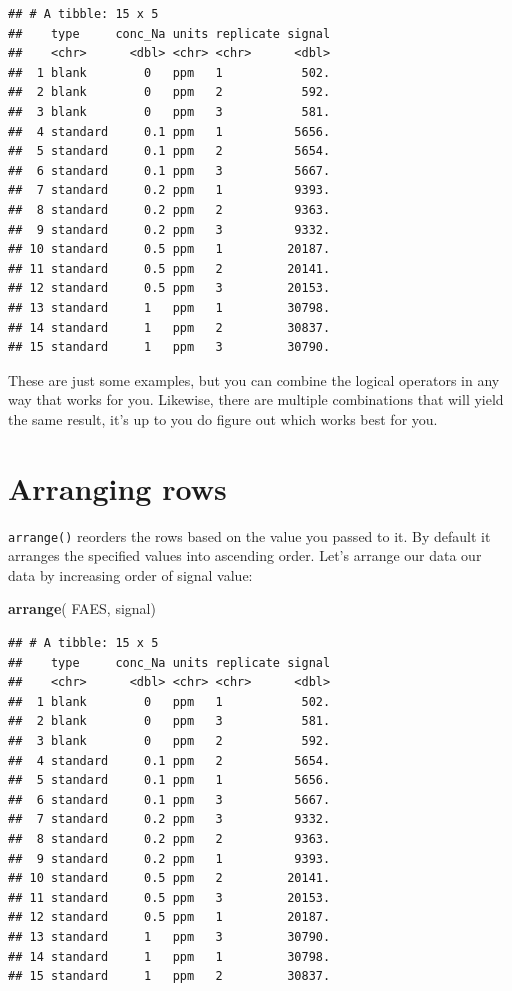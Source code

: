 \documentclass[
]{book}
\newenvironment{Shaded}{\begin{snugshade}}{\end{snugshade}}
\newcommand{\FunctionTok}[1]{\textcolor[rgb]{0.13,0.29,0.53}{\textbf{#1}}}
\newcommand{\NormalTok}[1]{#1}
\begin{document}
\begin{verbatim}
## # A tibble: 15 x 5
##    type     conc_Na units replicate signal
##    <chr>      <dbl> <chr> <chr>      <dbl>
##  1 blank        0   ppm   1           502.
##  2 blank        0   ppm   2           592.
##  3 blank        0   ppm   3           581.
##  4 standard     0.1 ppm   1          5656.
##  5 standard     0.1 ppm   2          5654.
##  6 standard     0.1 ppm   3          5667.
##  7 standard     0.2 ppm   1          9393.
##  8 standard     0.2 ppm   2          9363.
##  9 standard     0.2 ppm   3          9332.
## 10 standard     0.5 ppm   1         20187.
## 11 standard     0.5 ppm   2         20141.
## 12 standard     0.5 ppm   3         20153.
## 13 standard     1   ppm   1         30798.
## 14 standard     1   ppm   2         30837.
## 15 standard     1   ppm   3         30790.
\end{verbatim}

These are just some examples, but you can combine the logical operators in any way that works for you. Likewise, there are multiple combinations that will yield the same result, it's up to you do figure out which works best for you.

\hypertarget{arranging-rows}{%
\section{Arranging rows}\label{arranging-rows}}

\texttt{arrange()} reorders the rows based on the value you passed to it. By default it arranges the specified values into ascending order. Let's arrange our data our data by increasing order of signal value:

\begin{Shaded}
\begin{Highlighting}[]
\FunctionTok{arrange}\NormalTok{( FAES, signal)}
\end{Highlighting}
\end{Shaded}

\begin{verbatim}
## # A tibble: 15 x 5
##    type     conc_Na units replicate signal
##    <chr>      <dbl> <chr> <chr>      <dbl>
##  1 blank        0   ppm   1           502.
##  2 blank        0   ppm   3           581.
##  3 blank        0   ppm   2           592.
##  4 standard     0.1 ppm   2          5654.
##  5 standard     0.1 ppm   1          5656.
##  6 standard     0.1 ppm   3          5667.
##  7 standard     0.2 ppm   3          9332.
##  8 standard     0.2 ppm   2          9363.
##  9 standard     0.2 ppm   1          9393.
## 10 standard     0.5 ppm   2         20141.
## 11 standard     0.5 ppm   3         20153.
## 12 standard     0.5 ppm   1         20187.
## 13 standard     1   ppm   3         30790.
## 14 standard     1   ppm   1         30798.
## 15 standard     1   ppm   2         30837.
\end{verbatim}
\end{document}
